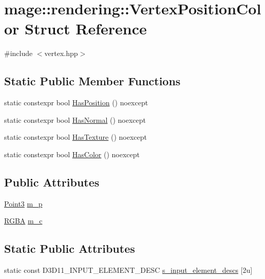 \hypertarget{structmage_1_1rendering_1_1_vertex_position_color}{}\section{mage\+:\+:rendering\+:\+:Vertex\+Position\+Color Struct Reference}
\label{structmage_1_1rendering_1_1_vertex_position_color}


{\ttfamily \#include $<$vertex.\+hpp$>$}

\subsection*{Static Public Member Functions}
\begin{DoxyCompactItemize}
\item 
static constexpr bool \mbox{\hyperlink{structmage_1_1rendering_1_1_vertex_position_color_a9a905a75c75030b37575a7b65dff61b0}{Has\+Position}} () noexcept
\item 
static constexpr bool \mbox{\hyperlink{structmage_1_1rendering_1_1_vertex_position_color_a95f2749a6f879b4123034a78c504f3c5}{Has\+Normal}} () noexcept
\item 
static constexpr bool \mbox{\hyperlink{structmage_1_1rendering_1_1_vertex_position_color_a1498641d42122251a8612b7b40d171da}{Has\+Texture}} () noexcept
\item 
static constexpr bool \mbox{\hyperlink{structmage_1_1rendering_1_1_vertex_position_color_aea75d3acadad3cd6da04d0fc2207fc0c}{Has\+Color}} () noexcept
\end{DoxyCompactItemize}
\subsection*{Public Attributes}
\begin{DoxyCompactItemize}
\item 
\mbox{\hyperlink{structmage_1_1_point3}{Point3}} \mbox{\hyperlink{structmage_1_1rendering_1_1_vertex_position_color_a2c1c6a22bff4eca8cee086cc978d008b}{m\+\_\+p}}
\item 
\mbox{\hyperlink{structmage_1_1_r_g_b_a}{R\+G\+BA}} \mbox{\hyperlink{structmage_1_1rendering_1_1_vertex_position_color_a76bd7cc2bbec92bbaf38f72087fdd069}{m\+\_\+c}}
\end{DoxyCompactItemize}
\subsection*{Static Public Attributes}
\begin{DoxyCompactItemize}
\item 
static const D3\+D11\+\_\+\+I\+N\+P\+U\+T\+\_\+\+E\+L\+E\+M\+E\+N\+T\+\_\+\+D\+E\+SC \mbox{\hyperlink{structmage_1_1rendering_1_1_vertex_position_color_a47ffcc58bc51df7018d71fd131e405b8}{s\+\_\+input\+\_\+element\+\_\+descs}} \mbox{[}2u\mbox{]}
\end{DoxyCompactItemize}


